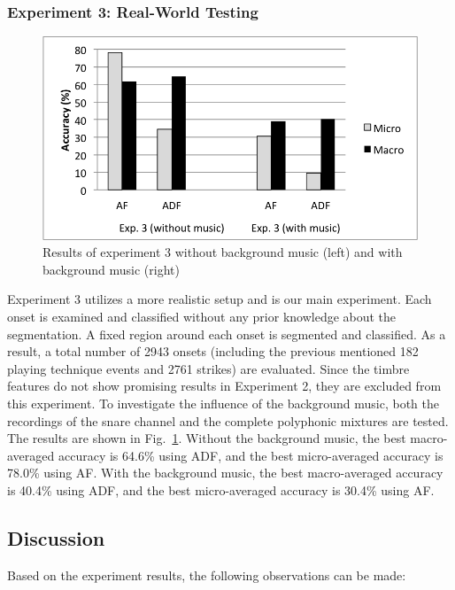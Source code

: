 \documentclass{article}
\begin{document}
\subsubsection{Experiment 3: Real-World Testing}\label{sssec:exp3}
\begin{figure}
\centering
\includegraphics[width = 8.0 cm]{./figures/exp3.png}
\caption{Results of experiment 3 without background music (left) and with background music (right)}
\label{fig:exp3}
\end{figure}
Experiment 3 utilizes a more realistic setup and is our main experiment. Each onset is examined and classified without any prior knowledge about the segmentation. A fixed region around each onset is segmented and classified. As a result, a total number of 2943 onsets (including the previous mentioned 182 playing technique events and 2761 strikes) are evaluated. Since the timbre features do not show promising results in Experiment 2, they are excluded from this experiment. To investigate the influence of the background music, both the recordings of the snare channel and the complete polyphonic mixtures are tested. The results are shown in Fig.~\ref{fig:exp3}. Without the background music, the best macro-averaged accuracy is 64.6\% using ADF, and the best micro-averaged accuracy is 78.0\% using AF. With the background music, the best macro-averaged accuracy is 40.4\% using ADF, and the best micro-averaged accuracy is 30.4\% using AF. 


\subsection{Discussion}
\label{ssec:discussion}
Based on the experiment results, the following observations can be made: 
\end{document}
